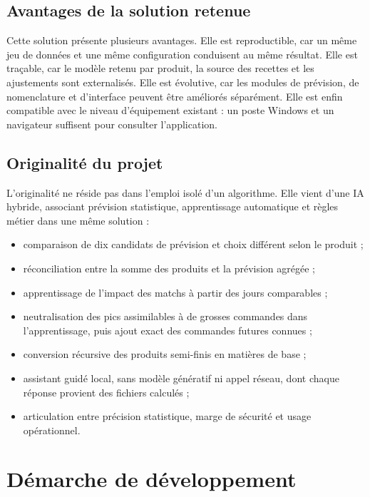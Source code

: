 \subsection{Avantages de la solution retenue}

Cette solution présente plusieurs avantages. Elle est reproductible, car un même
jeu de données et une même configuration conduisent au même résultat. Elle est
traçable, car le modèle retenu par produit, la source des recettes et les
ajustements sont externalisés. Elle est évolutive, car les modules de prévision,
de nomenclature et d'interface peuvent être améliorés séparément. Elle est enfin
compatible avec le niveau d'équipement existant : un poste Windows et un
navigateur suffisent pour consulter l'application.

\subsection{Originalité du projet}

L'originalité ne réside pas dans l'emploi isolé d'un algorithme. Elle vient d'une
IA hybride, associant prévision statistique, apprentissage automatique et règles
métier dans une même solution :

\begin{itemize}
  \item comparaison de dix candidats de prévision et choix différent selon le produit ;
  \item réconciliation entre la somme des produits et la prévision agrégée ;
  \item apprentissage de l'impact des matchs à partir des jours comparables ;
  \item neutralisation des pics assimilables à de grosses commandes dans
  l'apprentissage, puis ajout exact des commandes futures connues ;
  \item conversion récursive des produits semi-finis en matières de base ;
  \item assistant guidé local, sans modèle génératif ni appel réseau, dont chaque
  réponse provient des fichiers calculés ;
  \item articulation entre précision statistique, marge de sécurité et usage
  opérationnel.
\end{itemize}

\section{Démarche de développement}

